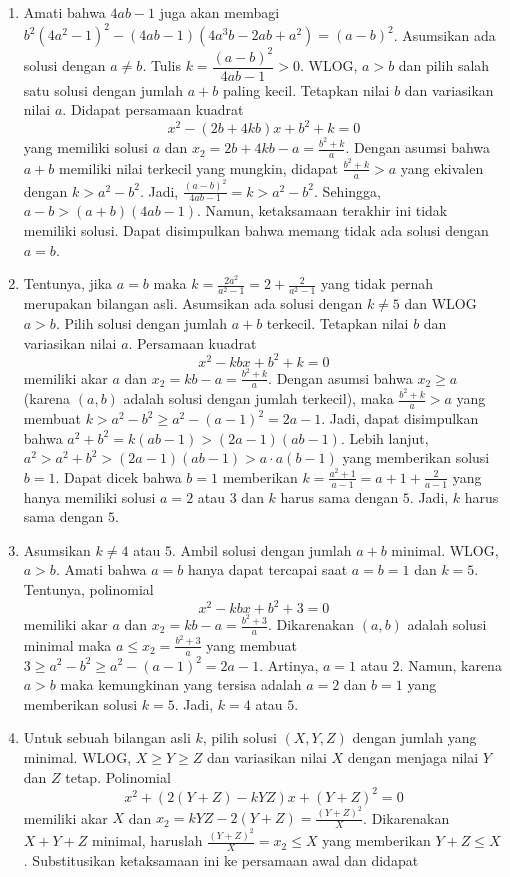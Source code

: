 \documentclass[11pt]{scrartcl}
\begin{document}
\begin{enumerate}
    \item Amati bahwa $4ab - 1$ juga akan membagi $b^2(4a^2 - 1)^2 - (4ab - 1)(4a^3b - 2ab + a^2) = (a - b)^2$. Asumsikan ada solusi dengan $a \neq b$. Tulis $k = \dfrac{(a - b)^2}{4ab - 1} > 0$. WLOG, $a > b$ dan pilih salah satu solusi dengan jumlah $a + b$ paling kecil. Tetapkan nilai $b$ dan variasikan nilai $a$. Didapat persamaan kuadrat \[x^2 - (2b + 4kb)x + b^2 + k = 0\] yang memiliki solusi $a$ dan $x_2 = 2b + 4kb - a = \frac{b^2 + k}{a}$. Dengan asumsi bahwa $a + b$ memiliki nilai terkecil yang mungkin, didapat $\frac{b^2 + k}{a} > a$ yang ekivalen dengan $k > a^2  - b^2$. Jadi, $\frac{(a - b)^2}{4ab - 1} = k > a^2 - b^2$. Sehingga, $a - b > (a + b)(4ab - 1)$. Namun, ketaksamaan terakhir ini tidak memiliki solusi. Dapat disimpulkan bahwa memang tidak ada solusi dengan $a = b$.
    \item Tentunya, jika $a = b$ maka $k = \frac{2a^2}{a^2 - 1} = 2 + \frac{2}{a^2 - 1}$ yang tidak pernah merupakan bilangan asli. Asumsikan ada solusi dengan $k \neq 5$ dan WLOG $a > b$. Pilih solusi dengan jumlah $a + b$ terkecil. Tetapkan nilai $b$ dan variasikan nilai $a$. Persamaan kuadrat \[x^2 - kbx + b^2 + k = 0\] memiliki akar $a$ dan $x_2 = kb - a = \frac{b^2 + k}{a}$. Dengan asumsi bahwa $x_2 \geq a$ (karena $(a, b)$ adalah solusi dengan jumlah terkecil), maka $\frac{b^2 + k}{a} > a$ yang membuat $k > a^2 - b^2 \geq a^2 - (a - 1)^2 = 2a - 1$. Jadi, dapat disimpulkan bahwa $a^2 + b^2 = k(ab - 1) > (2a - 1)(ab - 1)$. Lebih lanjut, $a^2 > a^2 + b^2 > (2a - 1)(ab - 1) > a\cdot a(b - 1)$ yang memberikan solusi $b = 1$. Dapat dicek bahwa $b = 1$ memberikan $k = \frac{a^2 + 1}{a - 1} = a + 1 + \frac{2}{a - 1}$ yang hanya memiliki solusi $a = 2$ atau $3$ dan $k$ harus sama dengan $5$. Jadi, $k$ harus sama dengan $5$.
    \item Asumsikan $k \neq 4$ atau $5$. Ambil solusi dengan jumlah $a + b$ minimal. WLOG, $a > b$. Amati bahwa $a = b$ hanya dapat tercapai saat $a = b = 1$ dan $k = 5$. Tentunya, polinomial \[x^2 - kbx + b^2 + 3 = 0\] memiliki akar $a$ dan $x_2 = kb - a = \frac{b^2 + 3}{a}$. Dikarenakan $(a, b)$ adalah solusi minimal maka $a \leq x_2 = \frac{b^2 + 3}{a}$ yang membuat $3 \geq a^2 - b^2 \geq a^2 - (a - 1)^2 = 2a - 1$. Artinya, $a = 1$ atau $2$. Namun, karena $a > b$ maka kemungkinan yang tersisa adalah $a = 2$ dan $b = 1$ yang memberikan solusi $k = 5$. Jadi, $k = 4$ atau $5$.
    \item Untuk sebuah bilangan asli $k$, pilih solusi $(X, Y, Z)$ dengan jumlah yang minimal. WLOG, $X \geq Y \geq Z$ dan variasikan nilai $X$ dengan menjaga nilai $Y$ dan $Z$ tetap. Polinomial \[x^2 + (2(Y + Z) - kYZ)x + (Y + Z)^2 = 0\] memiliki akar $X$ dan $x_2 = kYZ - 2(Y + Z) = \frac{(Y + Z)^2}{X}$. Dikarenakan $X + Y + Z$ minimal, haruslah $\frac{(Y + Z)^2}{X} = x_2 \leq X$  yang memberikan $Y + Z \leq X$. Substitusikan ketaksamaan ini ke persamaan awal dan didapat 

\end{enumerate}
\end{document}

